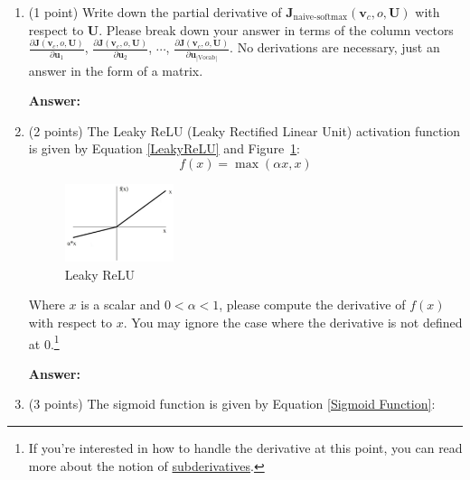 \documentclass{article}
\newenvironment{answer}{
    {\bf Answer:} \sf \begingroup\color{red}
}{\endgroup}%
\begin{document}
\begin{enumerate}[label=(\alph*)]
\item (1 point) Write down the partial derivative of $\bm J_{\text{naive-softmax}}(\bm v_c, o, \bm U)$ with respect to $\bm U$. Please break down your answer in terms of the column vectors $\frac{\partial \bm J(\bm v_c, o, \bm U)}{\partial \bm u_1}$, $\frac{\partial \bm J(\bm v_c, o, \bm U)}{\partial \bm u_2}$, $\cdots$, $\frac{\partial \bm J(\bm v_c, o, \bm U)}{\partial \bm u_{|\text{Vocab}|}}$. No derivations are necessary, just an answer in the form of a matrix.

\begin{shaded}
\begin{answer}

\end{answer}
\end{shaded}

\item (2 points) The Leaky ReLU (Leaky Rectified Linear Unit) activation function is given by Equation \ref{LeakyReLU} and Figure~\ref{fig:leaky_relu}:
\begin{equation}
    \label{LeakyReLU}
    f(x) = \max(\alpha x, x)
\end{equation}

\begin{figure}[h]
    \centering
    \includegraphics[width=0.3\textwidth]{leaky_relu_graph.png}
    \caption{Leaky ReLU}
    \label{fig:leaky_relu}
\end{figure}

Where $x$ is a scalar and $0<\alpha <1$, please compute the derivative of $f(x)$ with respect to $x$. You may ignore the case where the derivative is not defined at 0.\footnote{If you're interested in how to handle the derivative at this point, you can read more about the notion of \hyperref[https://en.wikipedia.org/wiki/Subderivative]{subderivatives}.}

\begin{shaded}
\begin{answer}

\end{answer}
\end{shaded}

\item (3 points) The sigmoid function is given by Equation \ref{Sigmoid Function}:


\end{enumerate}
\end{document}

